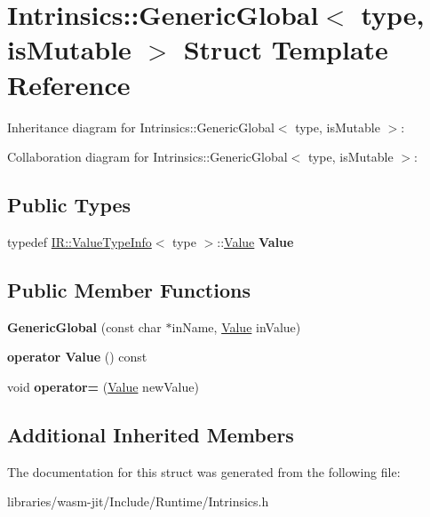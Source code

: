 \hypertarget{struct_intrinsics_1_1_generic_global}{}\section{Intrinsics\+:\+:Generic\+Global$<$ type, is\+Mutable $>$ Struct Template Reference}
\label{struct_intrinsics_1_1_generic_global}


Inheritance diagram for Intrinsics\+:\+:Generic\+Global$<$ type, is\+Mutable $>$\+:


Collaboration diagram for Intrinsics\+:\+:Generic\+Global$<$ type, is\+Mutable $>$\+:
\subsection*{Public Types}
\begin{DoxyCompactItemize}
\item 
\mbox{\label{struct_intrinsics_1_1_generic_global_a4f9ee4ceeb66bfc9193f4c3e891ab82a}} 
typedef \mbox{\hyperlink{struct_i_r_1_1_value_type_info}{I\+R\+::\+Value\+Type\+Info}}$<$ type $>$\+::\mbox{\hyperlink{struct_value}{Value}} {\bfseries Value}
\end{DoxyCompactItemize}
\subsection*{Public Member Functions}
\begin{DoxyCompactItemize}
\item 
\mbox{\label{struct_intrinsics_1_1_generic_global_afcffb3bfb1006fe1e3b2d4c27d3f3b5a}} 
{\bfseries Generic\+Global} (const char $\ast$in\+Name, \mbox{\hyperlink{struct_value}{Value}} in\+Value)
\item 
\mbox{\label{struct_intrinsics_1_1_generic_global_a900324a39f0c062ac660c36be067d92f}} 
{\bfseries operator Value} () const
\item 
\mbox{\label{struct_intrinsics_1_1_generic_global_a2eacf103f7ca36a81fc8d9f9b9423c16}} 
void {\bfseries operator=} (\mbox{\hyperlink{struct_value}{Value}} new\+Value)
\end{DoxyCompactItemize}
\subsection*{Additional Inherited Members}


The documentation for this struct was generated from the following file\+:\begin{DoxyCompactItemize}
\item 
libraries/wasm-\/jit/\+Include/\+Runtime/Intrinsics.\+h\end{DoxyCompactItemize}
